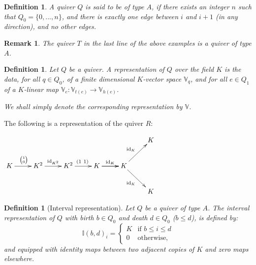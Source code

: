 \documentclass[11pt]{article}
\newtheorem{remark}[theorem]{Remark}
\newtheorem{definition}[theorem]{Definition}
\theoremstyle{remark}
\newcommand{\V}{\mathbb{V}}
\newcommand{\I}{\mathbb{I}}
\begin{document}
\begin{definition}
A quiver $Q$ is said to be of type $A$, if there exists an integer $n$ such that $Q_0 = \{0,...,n\}$, and there is exactly one edge between $i$ and $i+1$ (in any direction), and no other edges.
\end{definition}

\begin{remark}
The quiver $T$ in the last line of the above examples is a quiver of type $A$.
\end{remark}




\begin{definition}
Let $Q$ be a quiver. A representation of $Q$ over the field $K$ is the data, for all $q \in Q_0$, of a finite dimensional $K$-vector space $\V_q$, and for all $e \in Q_1$ of a $K$-linear map $\V_e : \V_{t(e)} \longrightarrow \V_{h(e)}$.

\noindent We shall simply denote the corresponding representation by $\V$.
\end{definition}

The following is a representation of the quiver $R$:

\begin{center}
     $\xymatrix{ &   &  &  & & K \\
    K \ar[r]^{\tiny \begin{pmatrix} 1 \\ 0 \end{pmatrix}} & K^2 \ar[r]^{\text{id}_{K^2}} & K^2 \ar[r]^{(1~1)} & K \ar[r]\ar[r]^{\text{id}_K} & K \ar[rd]_{\text{id}_K} \ar[ru]^{\text{id}_K} \\ 
    &   &  &  & & K}$
    
\end{center}
    


\begin{definition}[Interval representation]
Let $Q$ be a quiver of type $A$. The interval representation of $Q$ with birth $b \in Q_0$ and death $d \in Q_0$ ($b \leq d$), is defined by:
\begin{equation*}
\I(b,d)_i= \begin{cases}
             K  & \text{if } b\leq i\leq d \\
             0  & \text{otherwise,}
       \end{cases}
\end{equation*}
and equipped with identity maps between two adjacent copies of $K$ and zero maps elsewhere.
\end{definition}
\end{document}
